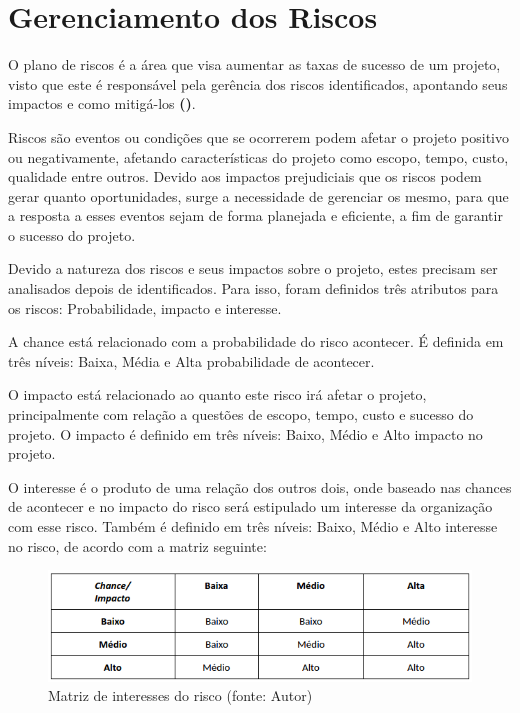 \chapter[Gerenciamento dos Riscos]{Gerenciamento dos Riscos}

O plano de riscos é a área que visa aumentar as taxas de sucesso de um projeto, visto que este é responsável pela gerência dos riscos identificados, apontando seus impactos e como mitigá-los \textbf{(\cite{pmbok2004})}.

Riscos são eventos ou condições que se ocorrerem podem afetar o projeto positivo ou negativamente, afetando características do projeto como escopo, tempo, custo, qualidade entre outros. Devido aos impactos prejudiciais que os riscos podem gerar quanto oportunidades, surge a necessidade de gerenciar os mesmo, para que a resposta a esses eventos sejam de forma planejada e eficiente, a fim de garantir o sucesso do projeto.

Devido a natureza dos riscos e seus impactos sobre o projeto, estes precisam ser analisados depois de identificados. Para isso, foram definidos três atributos para os riscos: Probabilidade, impacto e interesse. 

A chance está relacionado com a probabilidade do risco acontecer. É definida em três níveis: Baixa, Média e Alta probabilidade de acontecer.

O impacto está relacionado ao quanto este risco irá afetar o projeto, principalmente com relação a questões de escopo, tempo, custo e sucesso do projeto. O impacto é definido em três níveis: Baixo, Médio e Alto impacto no projeto.

O interesse é o produto de uma relação dos outros dois, onde baseado nas chances de acontecer e no impacto do risco será estipulado um interesse da organização com esse risco. Também é definido em três níveis: Baixo, Médio e Alto interesse no risco, de acordo com a matriz seguinte:

\begin{figure}[!ht]
\centering
\includegraphics[scale=0.4, angle = 360]{figuras/risco1}
\caption{Matriz de interesses do risco (fonte: Autor)}
\label{Matriz de interesses do risco (fonte: Autor)}
\end{figure}
\FloatBarrier

